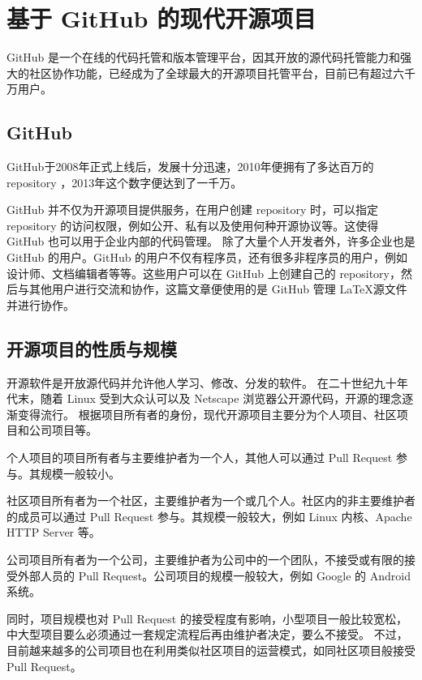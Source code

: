 \documentclass[../main.tex]{subfiles}
\begin{document}
\section{基于 GitHub 的现代开源项目}

GitHub 是一个在线的代码托管和版本管理平台，因其开放的源代码托管能力和强大的社区协作功能，已经成为了全球最大的开源项目托管平台，目前已有超过六千万用户。

\subsection{GitHub}

GitHub于2008年正式上线后，发展十分迅速，2010年便拥有了多达百万的 repository \cite{github_million}，2013年这个数字便达到了一千万\cite{github_ten_million}。

GitHub 并不仅为开源项目提供服务，在用户创建 repository 时，可以指定 repository 的访问权限，例如公开、私有以及使用何种开源协议等。这使得 GitHub 也可以用于企业内部的代码管理。
除了大量个人开发者外，许多企业也是 GitHub 的用户。GitHub 的用户不仅有程序员，还有很多非程序员的用户，例如设计师、文档编辑者等等。这些用户可以在 GitHub 上创建自己的 repository，然后与其他用户进行交流和协作，这篇文章便使用的是 GitHub 管理 \LaTeX 源文件并进行协作。

\subsection{开源项目的性质与规模}

开源软件是开放源代码并允许他人学习、修改、分发的软件。
在二十世纪九十年代末，随着 Linux 受到大众认可以及 Netscape 浏览器公开源代码，开源的理念逐渐变得流行\cite{opensource}。
根据项目所有者的身份，现代开源项目主要分为个人项目、社区项目和公司项目等。

个人项目的项目所有者与主要维护者为一个人，其他人可以通过 Pull Request 参与。其规模一般较小。

社区项目所有者为一个社区，主要维护者为一个或几个人。社区内的非主要维护者的成员可以通过 Pull Request 参与。其规模一般较大，例如 Linux 内核、Apache HTTP Server 等。

公司项目所有者为一个公司，主要维护者为公司中的一个团队，不接受或有限的接受外部人员的 Pull Request。公司项目的规模一般较大，例如 Google 的 Android 系统。

同时，项目规模也对 Pull Request 的接受程度有影响，小型项目一般比较宽松，中大型项目要么必须通过一套规定流程后再由维护者决定，要么不接受。
不过，目前越来越多的公司项目也在利用类似社区项目的运营模式，如同社区项目般接受 Pull Request。
\end{document}
